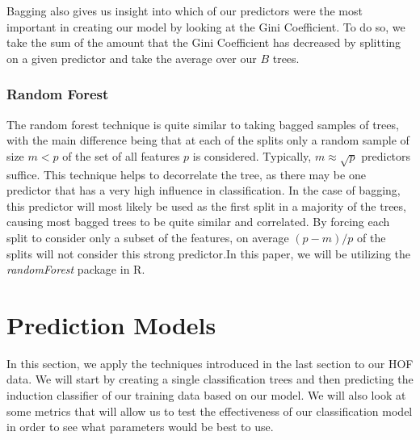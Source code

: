 \documentclass[preprint,12pt]{elsarticle}
\begin{document}
Bagging also gives us insight into which of our predictors were the most important in creating our model by looking at the Gini Coefficient. To do so, we take the sum of the amount that the Gini Coefficient has decreased by splitting on a given predictor and take the average over our $B$ trees.

\subsubsection{Random Forest}



The random forest technique is quite similar to taking bagged  samples of trees, with the main difference being that at each of the splits only a random sample of size $m < p$ of the set of all features $p$ is considered. Typically, $m \approx \sqrt{p}$ predictors suffice\cite{Breiman2001}. This technique helps to decorrelate the tree, as there may be one predictor that has a very high influence in classification. In the case of bagging, this predictor will most likely be used as the first split in a majority of the trees, causing most bagged trees to be quite similar and correlated. By forcing each split to consider only a subset of the features, on average $(p-m)/p$ of the splits will not consider this strong predictor\cite{Breiman2001}.In this paper, we will be utilizing the \textit{randomForest} package in R. 

\section{Prediction Models}

In this section, we apply the techniques introduced in the last section to our HOF data. We will start by creating a single classification trees and then predicting the induction classifier of our training data based on our model. We will also look at some metrics that will allow us to test the effectiveness of our classification model in order to see what parameters would be best to use. 
\end{document}
